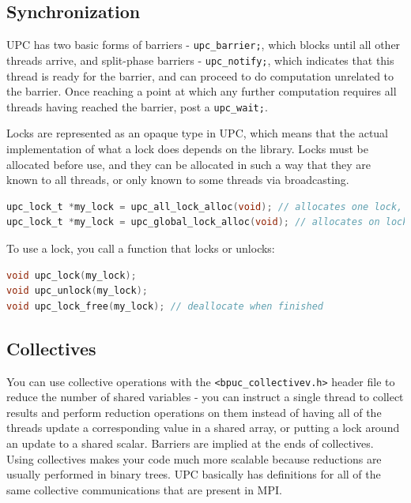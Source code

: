 \documentclass[10pt]{article}
\begin{document}
\begin{flushleft}
\subsection{Synchronization}

UPC has two basic forms of barriers - {\tt upc\_barrier;}, which blocks until all other threads arrive, and split-phase barriers - {\tt upc\_notify;}, which indicates that this thread is ready for the barrier, and can proceed to do computation unrelated to the barrier. Once reaching a point at which any further computation requires all threads having reached the barrier, post a {\tt upc\_wait;}. 

Locks are represented as an opaque type in UPC, which means that the actual implementation of what a lock does depends on the library. Locks must be allocated before use, and they can be allocated in such a way that they are known to all threads, or only known to some threads via broadcasting.

\begin{lstlisting}[language=C]
upc_lock_t *my_lock = upc_all_lock_alloc(void); // allocates one lock, known to all threads
upc_lock_t *my_lock = upc_global_lock_alloc(void); // allocates on lock, known to some threads
\end{lstlisting}

To use a lock, you call a function that locks or unlocks:

\begin{lstlisting}[language=C]
void upc_lock(my_lock);
void upc_unlock(my_lock);
void upc_lock_free(my_lock); // deallocate when finished
\end{lstlisting}


\subsection{Collectives}

You can use collective operations with the {\tt <bpuc\_collectivev.h>} header file to reduce the number of shared variables - you can instruct a single thread to collect results and perform reduction operations on them instead of having all of the threads update a corresponding value in a shared array, or putting a lock around an update to a shared scalar. Barriers are implied at the ends of collectives. Using collectives makes your code much more scalable because reductions are usually performed in binary trees. UPC basically has definitions for all of the same collective communications that are present in MPI. 


\end{flushleft}
\end{document}
